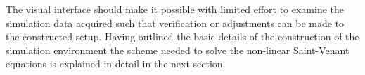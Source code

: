The visual interface should make it possible with limited effort to examine the simulation data acquired such that verification or adjustments can be made to the constructed setup. 
Having outlined the basic details of the construction of the simulation environment the scheme needed to solve the non-linear Saint-Venant equations is explained in detail in the next section. 